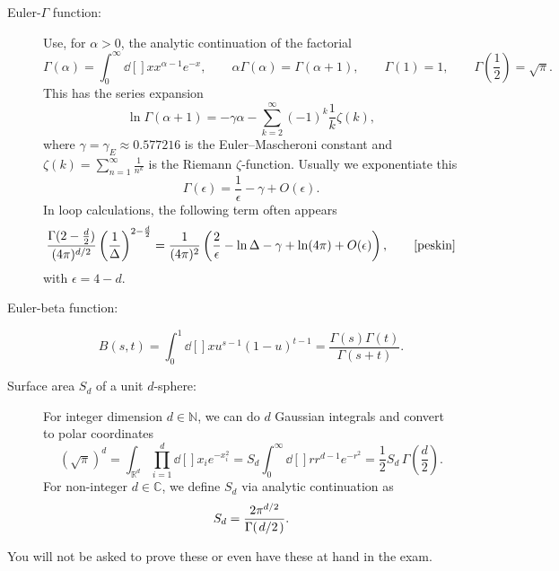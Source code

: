 \begin{appendices}
\begin{description}
  \item[Euler-$\Gamma$ function:]
    Use, for $\alpha > 0$, the analytic continuation of the factorial
    \begin{equation}
      \Gamma(\alpha) = \int_0^\infty \dd[]{x} x^{\alpha -1} e^{-x}, \qquad 
      \alpha \Gamma(\alpha) = \Gamma(\alpha + 1), \qquad 
      \Gamma(1) = 1, \qquad 
      \Gamma\left(\frac{1}{2}\right) = \sqrt{\pi}.
    \end{equation}
    This has the series expansion
    \begin{equation}
      \ln \Gamma(\alpha + 1) = -\gamma \alpha - \sum_{k=2}^{\infty} (-1)^k \frac{1}{k} \zeta(k),
    \end{equation}
    where $\gamma = \gamma_E \approx 0.577216$  is the Euler--Mascheroni constant and $\zeta(k) = \sum_{n=1}^{\infty} \frac{1}{n^k}$ is the Riemann $\zeta$-function.
    Usually we exponentiate this
    \begin{equation}
      \Gamma(\epsilon) = \frac{1}{\epsilon} - \gamma + O(\epsilon).
    \end{equation}
    In loop calculations, the following term often appears 
    \begin{equation}
      \frac{\Gamma(2 - \frac{d}{2})}{(4 \pi)^{d / 2}} \left( \frac{1}{\Delta} \right)^{2 - \frac{d}{2}} = \frac{1}{(4 \pi)^2} \left( \frac{2}{\epsilon} - \ln \Delta - \gamma + \ln(4 \pi) + O(\epsilon) \right), \qquad \cite[\text{Eq.~(A.52)}]{peskin}
    \end{equation}
    with $\epsilon = 4 - d$.

  \item[Euler-beta function:]
    \begin{equation}
      B(s, t) = \int_{0}^{1}\dd[]{x} u^{s-1} (1-u)^{t-1} = \frac{\Gamma(s) \Gamma(t)}{\Gamma(s + t)}.
    \end{equation}

  \item[Surface area $S_d$ of a unit $d$-sphere:]
    For integer dimension $d \in \mathbb{N}$, we can do $d$ Gaussian integrals and convert to polar coordinates
    \begin{equation}
      (\sqrt{\pi})^d = \int_{\mathbb{R}^d} \prod_{i=1}^d \dd[]{x_i} e^{-x_i^2} = S_d \int_0^{\infty} \dd[]{r} r^{d-1} e^{-r^2} = \frac{1}{2} S_d \, \Gamma(\frac{d}{2}).
    \end{equation}
    For non-integer $d \in \mathbb{C}$, we define $S_d$ via analytic continuation as
    \begin{equation}
      \label{eq:apx-sd}
      S_d = \frac{2 \pi^{d / 2}}{\Gamma(\flatfrac{d}{2})}.
    \end{equation}
\end{description}
\begin{remark}
  You will not be asked to prove these or even have these at hand in the exam.
\end{remark}


\end{appendices}
